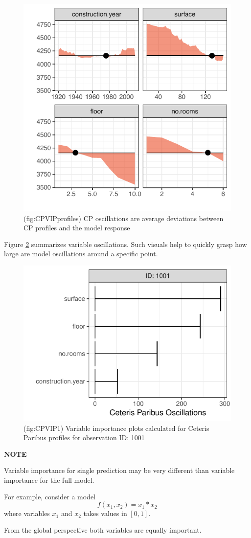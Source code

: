\documentclass[]{book}
\theoremstyle{definition}
\theoremstyle{definition}
\theoremstyle{definition}
\theoremstyle{remark}
\begin{document}
\begin{figure}

{\centering \includegraphics[width=0.5\linewidth]{figure/CP_VIP_profiles} 

}

\caption{(fig:CPVIPprofiles) CP oscillations are average deviations between CP profiles and the model response}\label{fig:CPVIPprofiles}
\end{figure}

Figure \ref{fig:CPVIP1} summarizes variable oscillations. Such visuals
help to quickly grasp how large are model oscillations around a specific
point.

\begin{figure}

{\centering \includegraphics[width=0.4\linewidth]{figure/cp_vip_1} 

}

\caption{(fig:CPVIP1) Variable importance plots calculated for Ceteris Paribus profiles for observation ID: 1001}\label{fig:CPVIP1}
\end{figure}

\textbf{NOTE}

Variable importance for single prediction may be very different than
variable importance for the full model.

For example, consider a model \[
f(x_1, x_2) = x_1 * x_2
\] where variables \(x_1\) and \(x_2\) takes values in \([0,1]\).

From the global perspective both variables are equally important.
\end{document}
